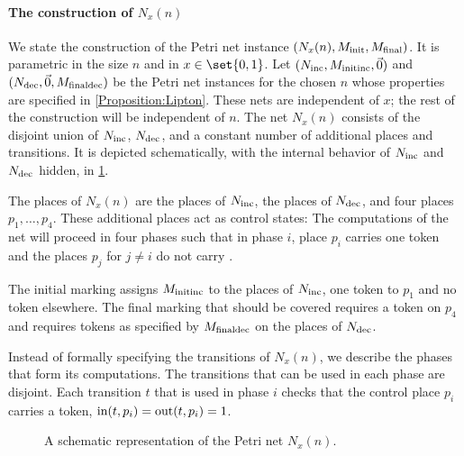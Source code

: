 \documentclass[../../diss.tex]{subfiles}
\begin{document}
\paragraph{The construction of $N_x(n)$}

We state the construction of the Petri net instance $(N_x(n),M_{\text{init}},M_{\text{final}})$.
It is parametric in the size $n$ and in $x \in \set{0,1}$.
Let $(N_{\text{inc}},M_{{\text{init}}{\text{inc}}},\vec{0})$ and $(N_{\text{dec}},\vec{0},M_{{\text{final}}{\text{dec}}})$ be the Petri net instances for the chosen $n$ whose properties are specified in \cref{Proposition:Lipton}.
These nets are independent of $x$; the rest of the construction will be independent of $n$.
The net $N_x(n)$ consists of the disjoint union of $N_{\text{inc}}$, $N_{\text{dec}}$, and a constant number of additional places and transitions.
It is depicted schematically, \ie with the internal behavior of $N_{\text{inc}}$ and $N_{\text{dec}}$ hidden, in \cref{Figure:SeparabilityLowerBound}.

The places of $N_x(n)$ are the places of $N_{\text{inc}}$, the places of $N_{\text{dec}}$, and four  places $p_1, \ldots, p_4$.
These additional places act as control states:
The computations of the net will proceed in four phases such that in phase $i$, place $p_i$ carries one token and the places $p_{j}$ for $j \neq i$ do not carry .

The initial marking assigns $M_{{\text{init}}{\text{inc}}}$ to the places of $N_{\text{inc}}$, one token to $p_1$ and no token elsewhere.
The final marking that should be covered requires a token on $p_4$ and requires tokens as specified by $M_{{\text{final}}{\text{dec}}}$ on the places of $N_{\text{dec}}$.

Instead of formally specifying the transitions of $N_x(n)$, we describe the phases that form its computations.
The transitions that can be used in each phase are disjoint.
Each transition $t$ that is used in phase $i$ checks that the control place $p_i$ carries a token, \ie $\text{in}(t,p_i) = \text{out}(t,p_i) = 1$.

\begin{figure}[b]
    \centering%
    \caption{A schematic representation of the Petri net $N_x(n)$.}%
    \label{Figure:SeparabilityLowerBound}%
\end{figure}
\end{document}
